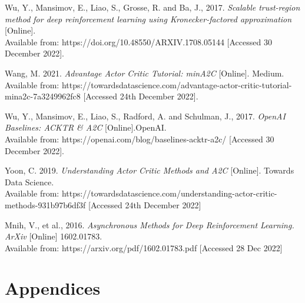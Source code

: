 \documentclass{article}
\begin{document}
Wu, Y., Mansimov, E., Liao, S., Grosse, R. and Ba, J., 2017. \emph{Scalable trust-region method for deep reinforcement learning using Kronecker-factored approximation} [Online]. \\
Available from: https://doi.org/10.48550/ARXIV.1708.05144 [Accessed 30 December 2022].

Wang, M. 2021. \emph{Advantage Actor Critic Tutorial: minA2C} [Online]. Medium. \\
Available from: https://towardsdatascience.com/advantage-actor-critic-tutorial-mina2c-7a3249962fc8 [Accessed 24th December 2022].

Wu, Y., Mansimov, E., Liao, S., Radford, A. and Schulman, J., 2017. \emph{OpenAI Baselines: ACKTR \& A2C} [Online].OpenAI. \\
Available from: https://openai.com/blog/baselines-acktr-a2c/ [Accessed 30 December 2022].

Yoon, C. 2019. \emph{Understanding Actor Critic Methods and A2C} [Online]. Towards Data Science. \\
Available from: https://towardsdatascience.com/understanding-actor-critic-methods-931b97b6df3f [Accessed 24th December 2022]

Mnih, V., et al., 2016. \emph{Asynchronous Methods for Deep Reinforcement Learning. ArXiv} [Online] 1602.01783. \\
Available from: https://arxiv.org/pdf/1602.01783.pdf [Accessed 28 Dec 2022]

\normalsize
\newpage
\section*{Appendices}
\end{document}
